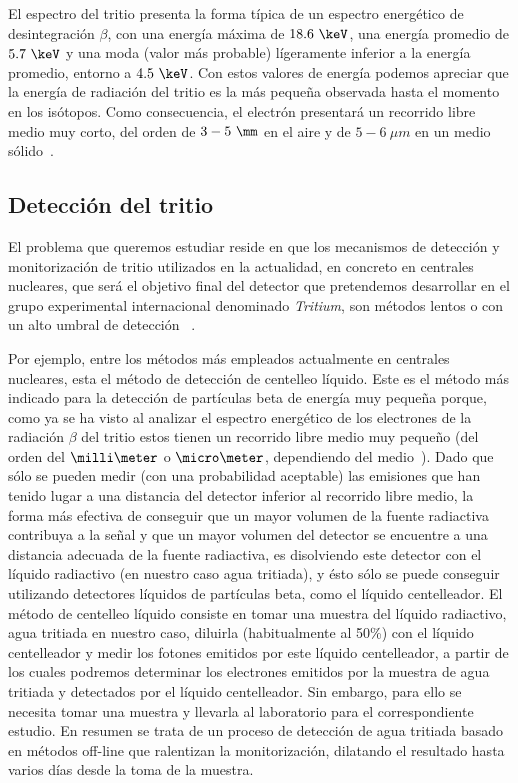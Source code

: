 El espectro del tritio presenta la forma típica de un espectro energético de desintegración $\beta$, con una energía máxima de $18.6~\keV$, una energía promedio de $5.7~\keV$ y una moda (valor más probable) lígeramente inferior a la energía promedio, entorno a $4.5~\keV$. Con estos valores de energía podemos apreciar que la energía de radiación del tritio es la más pequeña observada hasta el momento en los isótopos. Como consecuencia, el electrón presentará un recorrido libre medio muy corto, del orden de $3-5~\mm$ en el aire y de $5-6~\mu m$ en un medio sólido~\cite{Isotopos}.

\subsection{Detección del tritio}

El problema que queremos estudiar  reside en que los mecanismos de detección y monitorización de tritio utilizados en la actualidad, en concreto en centrales nucleares, que será el objetivo final del detector que pretendemos desarrollar en el grupo experimental internacional denominado \textit{Tritium}, son métodos lentos o con un alto umbral de detección ~\cite{limiteMB, Limitetiempo, Limite}. 


Por ejemplo, entre los métodos más empleados actualmente en centrales nucleares, esta el método de detección  de centelleo líquido. Este es el método más indicado para la detección de partículas beta de energía muy pequeña porque, como ya se ha visto al analizar el espectro energético de los electrones de la radiación   $\beta$ del tritio estos tienen un recorrido libre medio muy pequeño (del orden del $\milli\meter$ o $\micro\meter$, dependiendo del medio~\cite{Isotopos}). Dado que sólo se pueden medir (con una probabilidad aceptable) las emisiones que han tenido lugar a una distancia del detector inferior al recorrido libre medio, la forma más efectiva de conseguir que un mayor volumen de la fuente radiactiva contribuya a la señal y que un mayor volumen del detector se encuentre a una distancia adecuada de la fuente radiactiva, es disolviendo este detector con el líquido radiactivo (en nuestro caso agua tritiada), y ésto sólo se puede conseguir utilizando detectores líquidos de partículas beta, como el líquido centelleador. 
El método de centelleo líquido consiste en tomar una muestra del líquido radiactivo, agua tritiada en nuestro caso, diluirla (habitualmente al 50\%) con el líquido centelleador y medir los fotones emitidos por este líquido centelleador, a partir de los cuales podremos determinar los electrones emitidos por la muestra de agua tritiada y detectados por el líquido centelleador. Sin embargo, para ello se necesita tomar una muestra y llevarla al laboratorio para el correspondiente estudio. En resumen se trata de un proceso de detección de agua tritiada basado en métodos off-line que ralentizan la monitorización, dilatando el resultado hasta varios días desde la toma de la muestra. 

